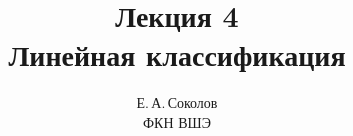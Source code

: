\documentclass[12pt,fleqn]{article}
\begin{document}
\title{Лекция 4\\Линейная классификация}
\author{Е.\,А.\,Соколов\\ФКН ВШЭ}
\maketitle






\end{document}
